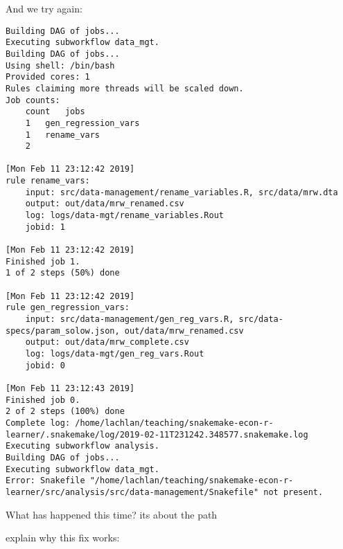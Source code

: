 \documentclass[]{book}
\newenvironment{Shaded}{\begin{snugshade}}{\end{snugshade}}
\newcommand{\KeywordTok}[1]{\textcolor[rgb]{0.13,0.29,0.53}{\textbf{{#1}}}}
\newcommand{\NormalTok}[1]{{#1}}
\theoremstyle{definition}
\theoremstyle{definition}
\theoremstyle{definition}
\theoremstyle{remark}
\begin{document}
And we try again:

\begin{Shaded}
\end{Shaded}

\begin{verbatim}
Building DAG of jobs...
Executing subworkflow data_mgt.
Building DAG of jobs...
Using shell: /bin/bash
Provided cores: 1
Rules claiming more threads will be scaled down.
Job counts:
    count   jobs
    1   gen_regression_vars
    1   rename_vars
    2

[Mon Feb 11 23:12:42 2019]
rule rename_vars:
    input: src/data-management/rename_variables.R, src/data/mrw.dta
    output: out/data/mrw_renamed.csv
    log: logs/data-mgt/rename_variables.Rout
    jobid: 1

[Mon Feb 11 23:12:42 2019]
Finished job 1.
1 of 2 steps (50%) done

[Mon Feb 11 23:12:42 2019]
rule gen_regression_vars:
    input: src/data-management/gen_reg_vars.R, src/data-specs/param_solow.json, out/data/mrw_renamed.csv
    output: out/data/mrw_complete.csv
    log: logs/data-mgt/gen_reg_vars.Rout
    jobid: 0

[Mon Feb 11 23:12:43 2019]
Finished job 0.
2 of 2 steps (100%) done
Complete log: /home/lachlan/teaching/snakemake-econ-r-learner/.snakemake/log/2019-02-11T231242.348577.snakemake.log
Executing subworkflow analysis.
Building DAG of jobs...
Executing subworkflow data_mgt.
Error: Snakefile "/home/lachlan/teaching/snakemake-econ-r-learner/src/analysis/src/data-management/Snakefile" not present.
\end{verbatim}

What has happened this time? its about the path

explain why this fix works:
\end{document}
